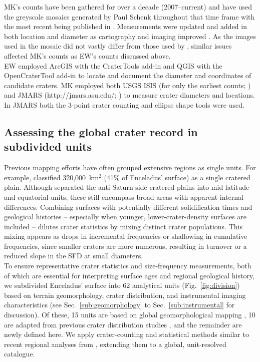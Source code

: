\documentclass[preprint,11pt,3p,times,authoryear]{elsarticle}
\begin{document}
MK's counts have been gathered for over a decade (2007–current) and have used the greyscale mosaics generated by Paul Schenk throughout that time frame \citep{Schenk2011,Schenk2018} with the most recent being published in \citet{Schenk2024}. Measurements were updated and added in both location and diameter as cartography and imaging improved \citet{Kirchoff2016,Kirchoff2018}. As the images used in the mosaic did not vastly differ from those used by \citet{Bland2018}, similar issues affected MK's counts as EW's counts discussed above.\\

EW employed ArcGIS with the CraterTools add-in \citep{Kneissl2011} and QGIS with the OpenCraterTool add-in \citep{Heyer2023} to locate and document the diameter and coordinates of candidate craters. MK employed both USGS ISIS (for only the earliest counts; \citealt{Kirchoff2009}) and JMARS (http://jmars.asu.edu/; \citealt{Christensen2009}) to measure crater diameters and locations.  In JMARS both the 3-point crater counting and ellipse shape tools were used.

\subsection{Assessing the global crater record in subdivided units}
\label{sub:units}
Previous mapping efforts have often grouped extensive regions as single units. For example, \citet{CrowWillard2015} classified 320,000~km$^{2}$ (41\% of Enceladus’ surface) as a single cratered plain. Although \citet{Kirchoff2009} separated the anti-Saturn side cratered plains into mid-latitude and equatorial units, these still encompass broad areas with apparent internal differences. Combining surfaces with potentially different solidification times and geological histories -- especially when younger, lower-crater-density surfaces are included -- dilutes crater statistics by mixing distinct crater populations. This mixing appears as drops in incremental frequencies or shallowing in cumulative frequencies, since smaller craters are more numerous, resulting in turnover or a reduced slope in the SFD at small diameters.\\

To ensure representative crater statistics and size-frequency measurements, both of which are essential for interpreting surface ages and regional geological history, we subdivided Enceladus’ surface into 62 analytical units (Fig.~\ref{fig:division}) based on terrain geomorphology, crater distribution, and instrumental imaging characteristics (see Sec.~\ref{sub:geomorphology} to Sec.~\ref{sub:instrumental} for discussion). Of these, 15 units are based on global geomorphological mapping \citep{CrowWillard2015}, 10 are adapted from previous crater distribution studies \citep{Kirchoff2009}, and the remainder are newly defined here. We apply crater-counting and statistical methods similar to recent regional analyses from \citet{Kinczyk2024}, extending them to a global, unit-resolved catalogue.\\
\end{document}
